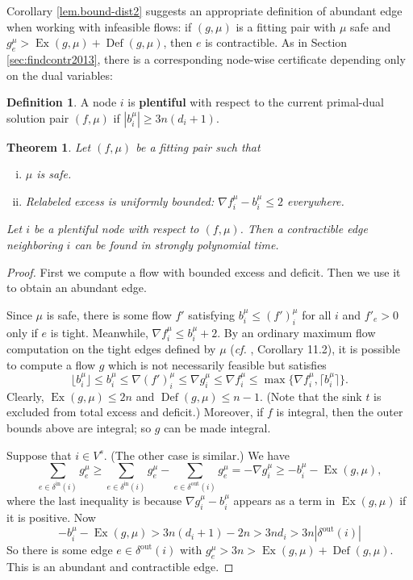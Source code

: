 \documentclass[11pt]{article}
\newtheorem{theorem}{Theorem}[section]
\theoremstyle{definition}
\newtheorem{definition}{Definition}[section]
\theoremstyle{definition}
\theoremstyle{definition}
\newcommand{\fu}{f^{\mu}}
\newcommand{\nfiu}{\nabla \fu_i}
\newcommand{\biu}{b_{i}^{\mu}}
\newcommand{\din}{\delta^{\text{in}}}
\newcommand{\dout}{\delta^{\text{out}}}
\newcommand{\vsrc}{V^{s}}
\DeclareMathOperator{\Ex}{Ex}
\DeclareMathOperator{\Def}{Def}
\begin{document}
    Corollary \ref{lem.bound-dist2} suggests an appropriate definition of abundant edge
    when working with infeasible flows: if $(g, \mu)$ is a fitting pair with $\mu$ safe and
    $g^\mu_e > \Ex(g, \mu) + \Def(g, \mu)$, then $e$ is contractible. As in Section
    \ref{sec:findcontr2013}, there is a corresponding node-wise certificate depending only on the dual
    variables:
    \begin{definition}
    A node $i$ is \textbf{plentiful} with respect
    to the current primal-dual solution pair $(f, \mu)$ if $|b_i^{\mu}| \ge 3n(d_i + 1)$.
    \end{definition}
	\begin{theorem} \label{thm:2017-contraction}
		Let $(f, \mu)$ be a fitting pair such that
		\begin{enumerate}[(i)]
			\item $\mu$ is safe.
			\item Relabeled excess is uniformly bounded: $\nabla f_i^\mu - \biu \leq 2$ everywhere.
		\end{enumerate}
        Let $i$ be a plentiful node with respect to $(f, \mu)$.
		Then a contractible edge neighboring $i$ can be found in strongly polynomial time.
	\end{theorem}
	\begin{proof}
		First we compute a flow with bounded excess and deficit. Then we use it to obtain
		an abundant edge.
		
		Since $\mu$ is safe, there is some flow $f'$ satisfying $\biu \leq (f')_i^\mu$
		for all $i$ and $f'_e > 0$ only if $e$ is tight. Meanwhile, $\nfiu \leq \biu + 2$.
		By an ordinary maximum flow computation on the tight edges defined by $\mu$
		(\emph{cf.} \cite{Schrijver2002}, Corollary 11.2),
		it is possible to compute a flow $g$ which is not necessarily feasible but satisfies
		\[ \lfloor \biu \rfloor \leq \biu \leq \nabla (f')_i^\mu
		   \leq \nabla g_i^\mu \leq \nfiu \leq \max \{\nfiu, \lceil\biu\rceil\}. \]
		Clearly, $\Ex(g, \mu) \leq 2n$ and $\Def(g, \mu) \leq n - 1$. (Note that the
		sink $t$ is excluded from total excess and deficit.) Moreover, if $f$ is
		integral, then the outer bounds above are integral; so $g$ can be made integral.
	
		Suppose that $i \in \vsrc$. (The other case is similar.) We have
		\[ \sum_{e \in \din(i)} g^\mu_e \geq
		\sum_{e \in \din(i)} g^\mu_e - \sum_{e \in \dout(i)} g^\mu_e
		= -\nabla g^\mu_i \geq -b_i^\mu - \Ex(g, \mu), \]
		where the last inequality is because $\nabla g_i^\mu - \biu$ appears
		as a term in $\Ex(g, \mu)$ if it is positive. Now
		\[ -b_i^\mu - \Ex(g, \mu) > 3n(d_i + 1) - 2n > 3nd_i > 3n|\dout(i)| \]
		So there is some edge $e \in \dout(i)$ with
		$g^\mu_e > 3n > \Ex(g, \mu) + \Def(g, \mu)$. This is an abundant and contractible
		edge.
	\end{proof}
\end{document}
